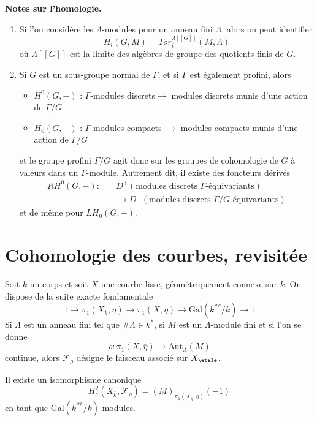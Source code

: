 \medskip\noindent
{\bf Notes sur l'homologie.}
\begin{enumerate}
\item Si l'on considère les $\Lambda$-modules pour un anneau fini $\Lambda$,
alors on peut identifier
$$
H_i(G, M)=Tor_i^{\Lambda[[G]]}(M, \Lambda)
$$
où $\Lambda[[G]]$ est la limite des algèbres de groupe des quotients finis
de $G$.
\item Si $G$ est un sous-groupe normal de $\Gamma$, et si $\Gamma$ est également
profini, alors
\begin{itemize}
\item $H^0(G, -)$ : $\Gamma$-modules discrets$\to$ modules discrets
munis d'une action de $\Gamma/G$
\item $H_0(G, -)$ : $\Gamma$-modules compacts $\to$ modules compacts
munis d'une action de $\Gamma/G$
\end{itemize}
et le groupe profini $\Gamma/G$ agit donc sur les groupes de cohomologie
de $G$ à valeurs dans un $\Gamma$-module. Autrement dit, il existe des foncteurs
dérivés
$$
\begin{aligned}
RH^0(G, -) :\quad
&D^{+}(\text{modules discrets }\Gamma\text{-équivariants})\\
&\longrightarrow
D^{+}(\text{modules discrets }\Gamma/G\text{-équivariants})
\end{aligned}
$$
et de même pour $LH_0(G, -)$.
\end{enumerate}








\section{Cohomologie des courbes, revisitée}
\label{section-cohomology-curves-revisited}

\noindent
Soit $k$ un corps et soit $X$ une courbe lisse, géométriquement connexe sur $k$.
On dispose de la suite exacte fondamentale
$$
1 \to
\pi_1(X_{\overline{k}}, \overline \eta) \to
\pi_1(X, \overline\eta) \to
\text{Gal}(k^{^{sep}}/k) \to 1
$$
Si $\Lambda$ est un anneau fini tel que $\#\Lambda\in k^*$, si $M$ est un
$\Lambda$-module fini et si l'on se donne
$$
\rho : \pi_1(X, \overline\eta) \to \text{Aut}_{\Lambda}(M)
$$
continue, alors $\mathcal{F}_\rho$ désigne le faisceau associé sur
$X_\etale$.

\begin{lemma}
\label{lemma-identify-h2c}
Il existe un isomorphisme canonique
$$
H_c^2(X_{\overline{k}}, \mathcal{F}_\rho)=(M)_{\pi_1(X_{\overline{k}},
\overline\eta)}(-1)
$$
en tant que $\text{Gal}(k^{^{sep}}/k)$-modules.
\end{lemma}

